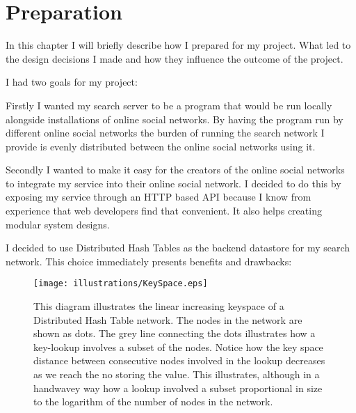 

\section{Preparation}

In this chapter I will briefly describe how I prepared for my project. What led to the design decisions I made and how they influence the outcome of the project.

\mbox{} %


I had two goals for my project:

Firstly I wanted my search server to be a program that would be run locally alongside installations of
online social networks. 
By having the program run by different online social networks the burden of running the search network I provide is evenly distributed between the online social networks using it. 

Secondly I wanted to make it easy for the creators of the online social networks to integrate my service into their online social network.
I decided to do this by exposing my service through an HTTP based API because I know from experience that web developers find that convenient. It also helps creating modular system designs.

% 

I decided to use Distributed Hash Tables as the backend datastore for my search network. This choice immediately presents benefits and drawbacks: 

\begin{figure}[!tb]
\begin{center}
	\texttt{[image: illustrations/KeySpace.eps]}
\caption{This diagram illustrates the linear increasing keyspace of a Distributed Hash Table network. The nodes in the network are shown as dots. The grey line connecting the dots illustrates how a key-lookup involves a subset of the nodes. Notice how the key space distance between consecutive nodes involved in the lookup decreases as we reach the no storing the value. This illustrates, although in a handwavey way how a lookup involved a subset proportional in size to the logarithm of the number of nodes in the network.}
\label{keySpace}
\end{center}
\end{figure}

